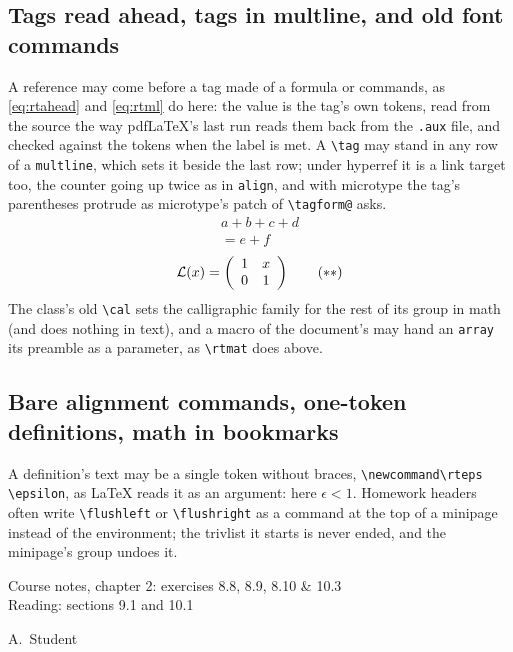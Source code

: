 \documentclass{article}
\numberwithin{equation}{section}
\theoremstyle{definition}
\theoremstyle{remark}
\begin{document}
\subsection{Tags read ahead, tags in multline, and old font commands}\label{sec:tagsahead}
\newcommand{\rtmat}[2]{\left(\begin{array}{#1}#2\end{array}\right)}%
A reference may come before a tag made of a formula or commands, as \ref{eq:rtahead} and
\eqref{eq:rtml} do here: the value is the tag's own tokens, read from the source the way
pdfLaTeX's last run reads them back from the \texttt{.aux} file, and checked against the
tokens when the label is met. A \verb|\tag| may stand in any row of a \texttt{multline},
which sets it beside the last row; under hyperref it is a link target too, the counter
going up twice as in \texttt{align}, and with microtype the tag's parentheses protrude as
microtype's patch of \verb|\tagform@| asks.
\begin{multline}
  a + b + c + d \tag{$\dagger$\,M}\label{eq:rtml} \\
  = e + f
\end{multline}
\begin{equation}
  {\cal L}(x) = \rtmat{cc}{1 & x\\ 0 & 1} \tag{$\ast\ast$}\label{eq:rtahead}
\end{equation}
The class's old \verb|\cal| sets the calligraphic family for the rest of its group in
math (and does nothing in text), and a macro of the document's may hand an \texttt{array}
its preamble as a parameter, as \verb|\rtmat| does above.

\subsection{Bare alignment commands, one-token definitions, math in bookmarks}\label{sec:bareflush}
\newcommand\rteps \epsilon%
A definition's text may be a single token without braces, \verb|\newcommand\rteps \epsilon|,
as \LaTeX{} reads it as an argument: here $\rteps < 1$. Homework headers often write
\verb|\flushleft| or \verb|\flushright| as a command at the top of a minipage instead of
the environment; the trivlist it starts is never ended, and the minipage's group undoes it.

\begin{minipage}[t]{.6\linewidth}
\flushleft
Course notes, chapter 2: exercises 8.8, 8.9, 8.10 \& 10.3\\
Reading: sections 9.1 and 10.1
\end{minipage}%
\begin{minipage}[t]{.4\linewidth}
\flushright
A.~Student
\end{minipage}
\end{document}
